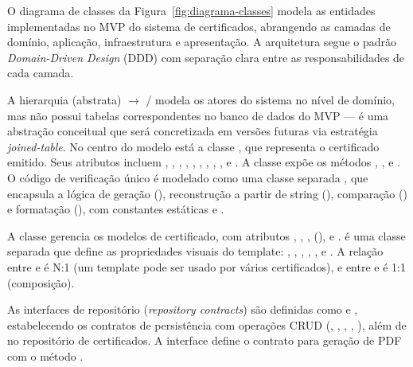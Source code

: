 O diagrama de classes da Figura~\ref{fig:diagrama-classes} modela as entidades implementadas no MVP do sistema de certificados, abrangendo as camadas de domínio, aplicação, infraestrutura e apresentação. A arquitetura segue o padrão \textit{Domain-Driven Design} (DDD) com separação clara entre as responsabilidades de cada camada.

A hierarquia  (abstrata) $\rightarrow$  /  modela os atores do sistema no nível de domínio, mas não possui tabelas correspondentes no banco de dados do MVP --- é uma abstração conceitual que será concretizada em versões futuras via estratégia \textit{joined-table}. No centro do modelo está a classe , que representa o certificado emitido. Seus atributos incluem , , , , , , , , ,  e . A classe expõe os métodos , ,  e . O código de verificação único é modelado como uma classe separada , que encapsula a lógica de geração (), reconstrução a partir de string (), comparação () e formatação (), com constantes estáticas  e .

A classe  gerencia os modelos de certificado, com atributos , , ,  (),  e .  é uma classe separada que define as propriedades visuais do template: , , , , ,  e . A relação entre  e  é N:1 (um template pode ser usado por vários certificados), e entre  e  é 1:1 (composição).

As interfaces de repositório (\textit{repository contracts}) são definidas como  e , estabelecendo os contratos de persistência com operações CRUD (, , , , ), além de  no repositório de certificados. A interface  define o contrato para geração de PDF com o método .

